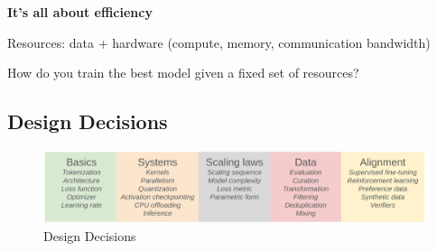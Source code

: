\textbf{It's all about efficiency}

{\color{dblue} Resources: data + hardware (compute, memory, communication bandwidth)}

{\color{tred}How do you train the best model given a fixed set of resources?}
\subsection*{Design Decisions}

\begin{figure}[htbp]
  \centering
  \includegraphics[width=1\linewidth]{figs/lec1/lec1.03.png}
  \caption{Design Decisions}
  \label{fig:design decisions}
\end{figure}


